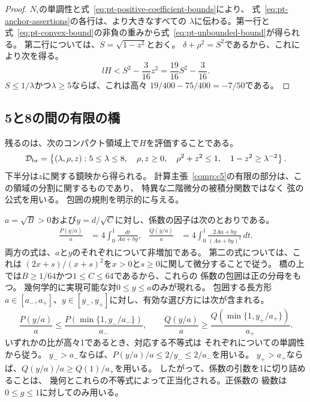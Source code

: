 \begin{proof}
$N_i$の単調性と式~\eqref{eq:pt-positive-coefficient-bounds}により、
式~\eqref{eq:pt-anchor-assertions}の各行は、より大きなすべての
$\lambda$に伝わる。第一行と
式~\eqref{eq:pt-convex-bound}の非負の重みから式~\eqref{eq:pt-unbounded-bound}が得られる。
第二行については、$S=\sqrt{1-z^2}$とおく。
$\delta+\rho^2=S^2$であるから、これにより次を得る。
\[
 lH<S^2-\frac{3}{16}z^2
 =\frac{19}{16}S^2-\frac{3}{16}.
\]
$S\leq1/\lambda$かつ$\lambda\geq5$ならば、これは高々
$19/400-75/400=-7/50$である。
\end{proof}

\subsection{5と8の間の有限の橋}
\label{subsec:pt-finite-bridge}

残るのは、次のコンパクト領域上で$H$を評価することである。
\begin{equation}
 \mathcal D_{\rm br}=
 \left\{(\lambda,\rho,z):
 5\leq\lambda\leq8,\quad \rho,z\geq0,\quad
 \rho^2+z^2\leq1,\quad 1-z^2\geq\lambda^{-2}\right\}.
\label{eq:pt-bridge-domain}
\end{equation}
下半分は$z$に関する鏡映から得られる。
計算主張~\ref{comp:c5}の有限の部分は、この領域の分割に関するものであり、
特異な二階微分の被積分関数ではなく
弦の公式を用いる。
包囲の規則を明示的に与える。

$a=\sqrt B>0$および$y=d/\sqrt C$に対し、係数の因子は次のとおりである。
\begin{align}
 \frac{P(y/a)}a
 &=4\int_0^1\frac{dt}{Aa+by},&
 \frac{Q(y/a)}a
 &=4\int_0^1\frac{2Aa+by}{(Aa+by)^2}\,dt.
 \label{eq:pt-scaled-coefficient-integrals}
\end{align}
両方の式は、$a$と$y$のそれぞれについて非増加である。
第二の式については、これは
$(2x+s)/(x+s)^2$を$x>0$と$s\geq0$に関して微分することで従う。
橋の上では$B\geq1/64$かつ$1\leq C\leq64$であるから、これらの
係数の包囲は正の分母をもつ。
幾何学的に実現可能な対$0\leq y\leq a$のみが現れる。
包囲する長方形
$a\in[a_-,a_+]$、$y\in[y_-,y_+]$に対し、有効な選び方には次が含まれる。
\begin{equation}
 \frac{P(y/a)}a
 \leq\frac{P(\min\{1,y_-/a_-\})}{a_-},\qquad
 \frac{Q(y/a)}a
 \geq\frac{Q(\min\{1,y_+/a_+\})}{a_+}.
\label{eq:pt-geometric-coefficient-clipping}
\end{equation}
いずれかの比が高々1であるとき、対応する不等式は
それぞれについての単調性から従う。
$y_->a_-$ならば、$P(y/a)/a\leq2/y_-\leq2/a_-$を用いる。
$y_+>a_+$ならば、$Q(y/a)/a\geq Q(1)/a_+$を用いる。
したがって、係数の引数を1に切り詰めることは、
幾何とこれらの不等式によって正当化される。正係数の
級数は$0\leq g\leq1$に対してのみ用いる。

